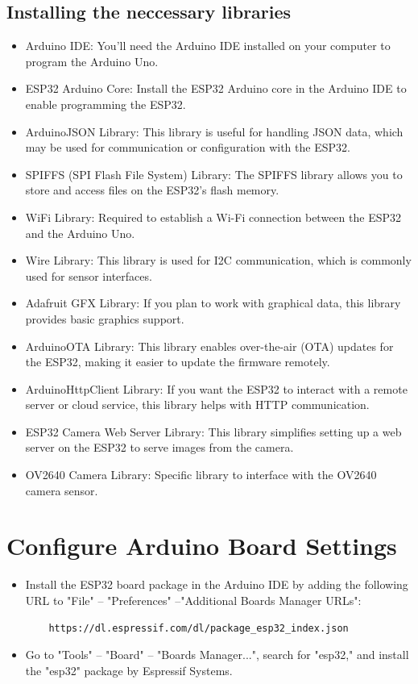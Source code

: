 \documentclass[a4paper,12pt,oneside]{book}
\begin{document}
\begin{enumerate}
\subsection*{Installing the neccessary libraries}
\begin{itemize}
    \item Arduino IDE: You'll need the Arduino IDE installed on your computer to program the Arduino Uno.
    \item ESP32 Arduino Core: Install the ESP32 Arduino core in the Arduino IDE to enable programming the ESP32.
    \item ArduinoJSON Library: This library is useful for handling JSON data, which may be used for communication or configuration with the ESP32.
    \item SPIFFS (SPI Flash File System) Library: The SPIFFS library allows you to store and access files on the ESP32's flash memory.
    \item WiFi Library: Required to establish a Wi-Fi connection between the ESP32 and the Arduino Uno.
    \item Wire Library: This library is used for I2C communication, which is commonly used for sensor interfaces.
    \item Adafruit GFX Library: If you plan to work with graphical data, this library provides basic graphics support.
    \item ArduinoOTA Library: This library enables over-the-air (OTA) updates for the ESP32, making it easier to update the firmware remotely.
    \item ArduinoHttpClient Library: If you want the ESP32 to interact with a remote server or cloud service, this library helps with HTTP communication.
    \item ESP32 Camera Web Server Library: This library simplifies setting up a web server on the ESP32 to serve images from the camera.
    \item OV2640 Camera Library: Specific library to interface with the OV2640 camera sensor.
\end{itemize}

\section*{Configure Arduino Board Settings}
\begin{itemize}
    \item Install the ESP32 board package in the Arduino IDE by adding the following URL to "File" -- "Preferences" --"Additional Boards Manager URLs":
    \begin{verbatim}
    https://dl.espressif.com/dl/package_esp32_index.json
    \end{verbatim}
    \item Go to "Tools" -- "Board" -- "Boards Manager...", search for "esp32," and install the "esp32" package by Espressif Systems.
\end{itemize}


\end{enumerate}
\end{document}
